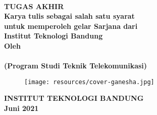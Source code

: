 \clearpage
\pagestyle{empty}


\begin{center}
    
    \smallskip
	\renewcommand{\baselinestretch}{1}
	
    \large{\bfseries \MakeUppercase{\thetitle}}
    \\[5\baselineskip]

    \large{\bfseries TUGAS AKHIR}
    \\[\baselineskip]
	
    \normalsize{ \bfseries
    	Karya tulis sebagai salah satu syarat\\
    	untuk memperoleh gelar Sarjana dari\\
    	Institut Teknologi Bandung
	}
    \\[3\baselineskip]

    \normalsize{ \bfseries Oleh\\}
    \large{ 
    	\bfseries \MakeUppercase{\theauthor}\\
    	(Program Studi Teknik Telekomunikasi)
	}

    \vfill
    \begin{figure}[h]
        \centering
      	\texttt{[image: resources/cover-ganesha.jpg]}
    \end{figure}
    \vfill

    \large{ \bfseries
	    \uppercase{
	        Institut Teknologi Bandung\\
	    }
    	Juni 2021
	}

\end{center}

\restoregeometry
\clearpage
